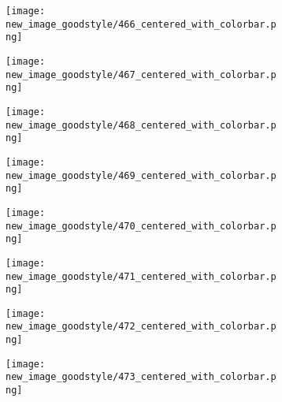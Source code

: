 \documentclass[a4paper,12pt]{article}
\begin{document}
\begin{figure}[H]
  \begin{subfigure}{0.11\textwidth}
    \texttt{[image: new\_image\_goodstyle/466\_centered\_with\_colorbar.png]}
  \end{subfigure}
  \hfill
  \begin{subfigure}{0.11\textwidth}
    \texttt{[image: new\_image\_goodstyle/467\_centered\_with\_colorbar.png]}
  \end{subfigure}
  \hfill
  \begin{subfigure}{0.11\textwidth}
    \texttt{[image: new\_image\_goodstyle/468\_centered\_with\_colorbar.png]}
  \end{subfigure}
  \hfill
  \begin{subfigure}{0.11\textwidth}
    \texttt{[image: new\_image\_goodstyle/469\_centered\_with\_colorbar.png]}
  \end{subfigure}
  \hfill
  \begin{subfigure}{0.11\textwidth}
    \texttt{[image: new\_image\_goodstyle/470\_centered\_with\_colorbar.png]}
  \end{subfigure}
  \hfill
  \begin{subfigure}{0.11\textwidth}
    \texttt{[image: new\_image\_goodstyle/471\_centered\_with\_colorbar.png]}
  \end{subfigure}
  \hfill
  \begin{subfigure}{0.11\textwidth}
    \texttt{[image: new\_image\_goodstyle/472\_centered\_with\_colorbar.png]}
  \end{subfigure}
  \hfill
  \begin{subfigure}{0.11\textwidth}
    \texttt{[image: new\_image\_goodstyle/473\_centered\_with\_colorbar.png]}
  \end{subfigure}
  \hfill
\end{figure}
\end{document}

